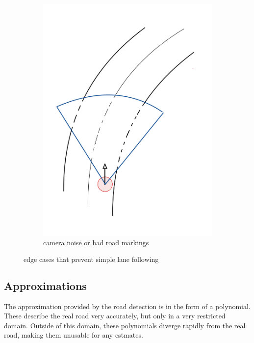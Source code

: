 \begin{figure}
\begin{subfigure}{.24\linewidth}
		\includegraphics[width=\textwidth]{Pictures/road detection noise}
		
		\caption{camera noise or bad road markings}
	\end{subfigure}


	\caption{edge cases that prevent simple lane following}
	\label{nav edge case}
\end{figure}



\subsection{Approximations}
\label{aprox}
The approximation provided by the road detection is in the form of a polynomial. These describe the real road very accurately, but only in a very restricted domain. Outside of this domain, these polynomials diverge rapidly from the real road, making them unusable for any estmates.

